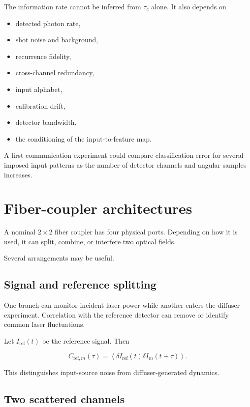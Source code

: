 \documentclass[11pt,letterpaper]{article}
\newcommand{\avg}[1]{\left\langle #1 \right\rangle}
\begin{document}
The information rate cannot be inferred from $\tau_c$ alone. It also depends
on

\begin{itemize}[leftmargin=2em]
    \item detected photon rate,
    \item shot noise and background,
    \item recurrence fidelity,
    \item cross-channel redundancy,
    \item input alphabet,
    \item calibration drift,
    \item detector bandwidth,
    \item the conditioning of the input-to-feature map.
\end{itemize}

A first communication experiment could compare classification error for
several imposed input patterns as the number of detector channels and
angular samples increases.

\section{Fiber-coupler architectures}

A nominal $2\times2$ fiber coupler has four physical ports. Depending on how
it is used, it can split, combine, or interfere two optical fields.

Several arrangements may be useful.

\subsection{Signal and reference splitting}

One branch can monitor incident laser power while another enters the
diffuser experiment. Correlation with the reference detector can remove or
identify common laser fluctuations.

Let $I_{\mathrm{ref}}(t)$ be the reference signal. Then

\begin{equation}
    C_{\mathrm{ref},m}(\tau)
    =
    \avg{
    \delta I_{\mathrm{ref}}(t)
    \delta I_m(t+\tau)
    }.
\end{equation}

This distinguishes input-source noise from diffuser-generated dynamics.

\subsection{Two scattered channels}
\end{document}
